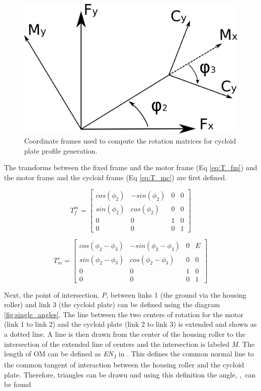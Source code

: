 \begin{figure}[!b]
   \centering
   \includegraphics[width=0.50\linewidth]{fig/single_stage_frames}
   \caption{Coordinate frames used to compute the rotation matrices for cycloid plate profile generation.}
   \label{fig:single_frames}
\end{figure}

The transforms between the fixed frame and the motor frame (Eq \ref{eq:T_fm}) and the motor frame and the cycloid frame (Eq \ref{eq:T_mc}) are first defined. 

\begin{equation} \label{eq:T_fm}
T_f^m = \left[{\begin{array}{cccc}
		cos(\phi_2) & -sin(\phi_2) & 0 & 0\\
		sin(\phi_2) & cos(\phi_2) & 0 & 0\\
		0 & 0 & 1 & 0\\
		0 & 0 & 0 & 1 \end{array} } \right]
\end{equation}

\begin{equation} \label{eq:T_mc}
T_m^c = \left[{\begin{array}{cccc}
		cos(\phi_2 - \phi_3) & -sin(\phi_2 - \phi_3) & 0 & E\\
		sin(\phi_2 - \phi_3) & cos(\phi_2 - \phi_3) & 0 & 0\\
		0 & 0 & 1 & 0\\
		0 & 0 & 0 & 1 \end{array} } \right]
\end{equation}

Next, the point of intersection, \textit{P}, between links 1 (the ground via the housing roller) and link 3 (the cycloid plate) can be defined using the diagram \ref{fig:single_angles}. The line between the two centers of rotation for the motor (link 1 to link 2) and the cycloid plate (link 2 to link 3) is extended and shown as a dotted line. A line is then drawn from the center of the housing roller to the intersection of the extended line of centers and the intersection is labeled \textit{M}. The length of OM can be defined as \textit{EN\textsubscript{1}} in \cite{ref:on_the_lobe}. This defines the common normal line to the common tangent of interaction between the housing roller and the cycloid plate. Therefore, triangles can be drawn and using this definition the angle, \textpsi,\ can be found 

